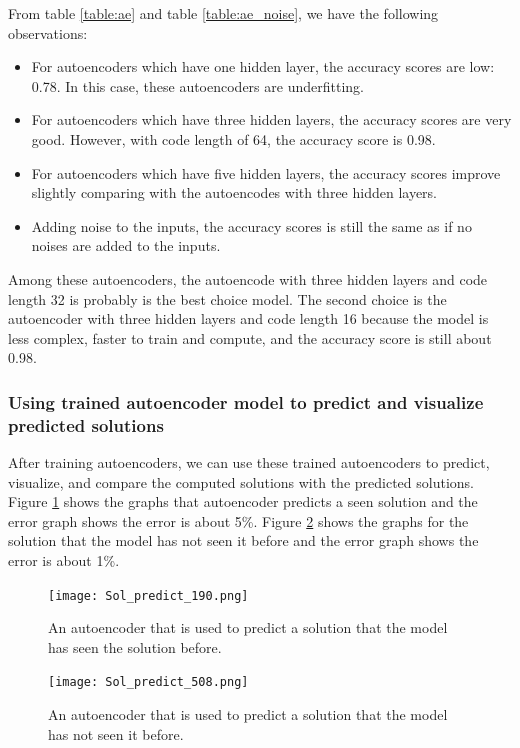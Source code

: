 \documentclass{article}
\begin{document}
\noindent From table \ref{table:ae} and table \ref{table:ae_noise}, we have the following observations:
\begin{itemize}
	\item For autoencoders which have one hidden layer, the accuracy scores are low: 0.78. In this case, these autoencoders are underfitting.
	\item For autoencoders which have three hidden layers, the accuracy scores are very good. However, with code length of 64, the accuracy score is 0.98.
	\item For autoencoders which have five hidden layers, the accuracy scores improve slightly comparing with the autoencodes with three hidden layers.
	\item Adding noise to the inputs, the accuracy scores is still the same as if no noises are added to the inputs.  
\end{itemize}
Among these autoencoders, the autoencode with three hidden layers and code length 32 is probably is the best choice model. The second choice is the autoencoder with three hidden layers and code length 16 because the model is less complex, faster to train and compute, and the accuracy score is still about 0.98.

\subsubsection{Using trained autoencoder model to predict and visualize predicted solutions}
After training autoencoders, we can use these trained autoencoders to predict, visualize, and compare the computed solutions with the predicted solutions. Figure \ref{fig:Sol190} shows the graphs that autoencoder predicts a seen solution and the error graph shows the error is about 5\%. Figure \ref{fig:Sol508} shows the graphs for the solution that the model has not seen it before and the error graph shows the error is about 1\%.

\begin{figure}[h]
	\centering
	\texttt{[image: Sol\_predict\_190.png]}
	\caption{An autoencoder that is used to predict a solution that the model has seen the solution before.}
	\label{fig:Sol190}
\end{figure}

\begin{figure}[h]
	\centering
	\texttt{[image: Sol\_predict\_508.png]}
	\caption{An autoencoder that is used to predict a solution that the model has not seen it before.}
	\label{fig:Sol508}
\end{figure}
\end{document}
